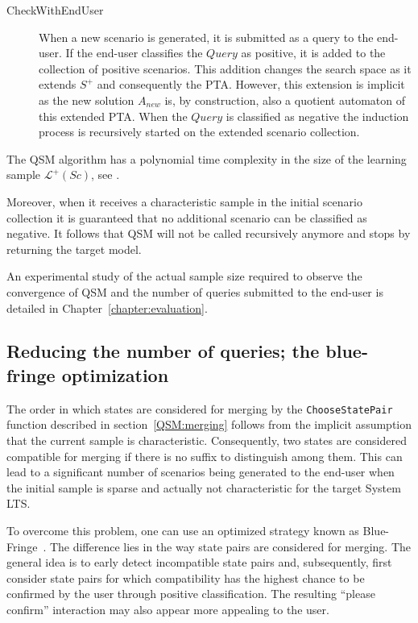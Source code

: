 \begin{description}
\item[CheckWithEndUser] When a new scenario is generated, it is submitted as a query to the end-user. If the end-user classifies the $Query$ as positive, it is added to the collection of positive scenarios. This addition changes the search space as it extends $S^+$ and consequently the PTA. However, this extension is implicit as the new solution $A_{new}$ is, by construction, also a quotient automaton of this extended PTA. When the $Query$ is classified as negative the induction process is recursively started on the extended scenario collection.

\end{description}

The QSM algorithm has a polynomial time complexity in the size of the learning sample $\mathcal{L}^+(Sc)$, see \cite{Dupont:2008}. 

Moreover, when it receives a characteristic sample in the initial scenario collection it is guaranteed that no additional scenario can be classified as negative. It follows that QSM will not be called recursively anymore and stops by returning the target model. 

An experimental study of the actual sample size required to observe the convergence of \textsc{QSM} and the number of queries submitted to the end-user is detailed in Chapter~\ref{chapter:evaluation}.

\subsection{Reducing the number of queries; the blue-fringe optimization\label{BlueFringe}}

The order in which states are considered for merging by the \texttt{ChooseStatePair} function described in section~\ref{QSM:merging} follows from the implicit assumption that the current sample is characteristic. Consequently, two states are considered compatible for merging if there is no suffix to distinguish among them. This can lead to a significant number of scenarios being generated to the end-user when the initial sample is sparse and actually not characteristic for the target System LTS. 

To overcome this problem, one can use an optimized strategy known as Blue-Fringe~\cite{Lang:1998}. The difference lies in the way state pairs are considered for merging. The general idea is to early detect incompatible state pairs and, subsequently, first consider state pairs for which compatibility has the highest chance to be confirmed by the user through positive classification. The resulting ``please confirm'' interaction may also appear more appealing to the user.

